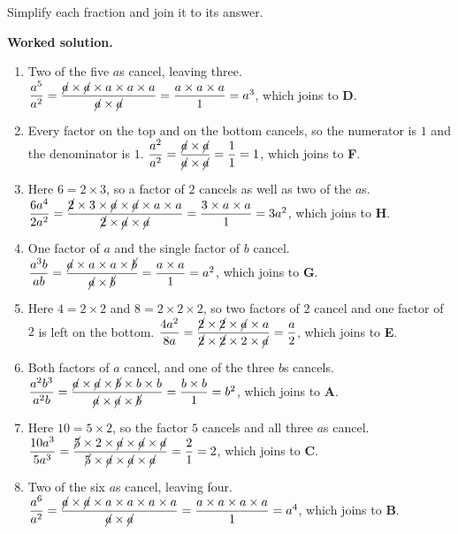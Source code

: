 \documentclass[12pt,a4paper]{article}
\newcommand{\qhead}[2]{\par\addvspace{9pt}%
  \noindent{\bfseries Q#1.}\enspace #2\par\nobreak}
\newcommand{\wsol}{\par\smallskip
  \noindent\textbf{\color{blue!50!black}Worked solution.}\space}
\begin{document}
\qhead{7}{Simplify each fraction and join it to its answer.}
\wsol
\begin{enumerate}[label=\textbf{\arabic*.}, leftmargin=*, itemsep=7pt]
\item Two of the five $a$s cancel, leaving three.
$\dfrac{a^5}{a^2}
  =\dfrac{\cancel{a}\times\cancel{a}\times a\times a\times a}
   {\cancel{a}\times\cancel{a}}=\dfrac{a\times a\times a}{1}=a^3$, which joins
to \textbf{D}.

\item Every factor on the top and on the bottom cancels, so the numerator is
$1$ and the denominator is $1$.
$\dfrac{a^2}{a^2}=\dfrac{\cancel{a}\times\cancel{a}}{\cancel{a}\times\cancel{a}}
  =\dfrac{1}{1}=1$, which joins to \textbf{F}.

\item Here $6=2\times3$, so a factor of $2$ cancels as well as two of the $a$s.
$\dfrac{6a^4}{2a^2}
  =\dfrac{\cancel{2}\times3\times\cancel{a}\times\cancel{a}\times a\times a}
   {\cancel{2}\times\cancel{a}\times\cancel{a}}
  =\dfrac{3\times a\times a}{1}=3a^2$, which joins to \textbf{H}.

\item One factor of $a$ and the single factor of $b$ cancel.
$\dfrac{a^3b}{ab}
  =\dfrac{\cancel{a}\times a\times a\times\cancel{b}}{\cancel{a}\times\cancel{b}}
  =\dfrac{a\times a}{1}=a^2$, which joins to \textbf{G}.

\item Here $4=2\times2$ and $8=2\times2\times2$, so two factors of $2$ cancel
and one factor of $2$ is left on the bottom.
$\dfrac{4a^2}{8a}
  =\dfrac{\cancel{2}\times\cancel{2}\times\cancel{a}\times a}
   {\cancel{2}\times\cancel{2}\times2\times\cancel{a}}=\dfrac{a}{2}$, which
joins to \textbf{E}.

\item Both factors of $a$ cancel, and one of the three $b$s cancels.
$\dfrac{a^2b^3}{a^2b}
  =\dfrac{\cancel{a}\times\cancel{a}\times\cancel{b}\times b\times b}
   {\cancel{a}\times\cancel{a}\times\cancel{b}}=\dfrac{b\times b}{1}=b^2$,
which joins to \textbf{A}.

\item Here $10=5\times2$, so the factor $5$ cancels and all three $a$s cancel.
$\dfrac{10a^3}{5a^3}
  =\dfrac{\cancel{5}\times2\times\cancel{a}\times\cancel{a}\times\cancel{a}}
   {\cancel{5}\times\cancel{a}\times\cancel{a}\times\cancel{a}}
  =\dfrac{2}{1}=2$, which joins to \textbf{C}.

\item Two of the six $a$s cancel, leaving four.
$\dfrac{a^6}{a^2}
  =\dfrac{\cancel{a}\times\cancel{a}\times a\times a\times a\times a}
   {\cancel{a}\times\cancel{a}}=\dfrac{a\times a\times a\times a}{1}=a^4$,
which joins to \textbf{B}.
\end{enumerate}
\end{document}
